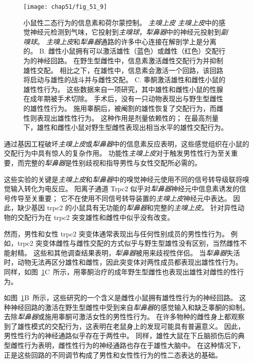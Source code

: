 \begin{figure}[htbp]
	\centering
	\texttt{[image: chap51/fig\_51\_9]}
	\caption{小鼠性二态行为的信息素和荷尔蒙控制。
		\textit{主嗅上皮} \textit{主嗅上皮}中的感觉神经元检测到气味，它投射到\textit{主嗅球}，\textit{犁鼻器}中的神经元投射到\textit{副嗅球}。
		\textit{主嗅上皮}和\textit{犁鼻器}通路的许多中心连接在解剖学上是分离的\cite{dulac2006genetic}。
		B. 雌性小鼠拥有可以激活雄性（蓝色）或雌性（红色）交配行为的神经回路。
		在野生型雌性中，信息素激活雌性交配行为并抑制雄性交配。
		相比之下，在雄性中，信息素会激活一个回路，该回路将启动与雄性的战斗并与雌性交配\cite{kimchi2007functional}。
		C. 睾酮激活雄性和雌性小鼠的雄性性行为。
		这些数据来自一项研究，其中雄性和雌性小鼠的性腺在成年期被手术切除。
		手术后，没有一只动物表现出与野生型雌性的雄性性行为。
		施用睾酮后，被阉割的雄性恢复了交配行为，而雌性则表现出雄性性行为。
		这种作用是剂量依赖性的；
		在最高剂量下，雄性和雌性小鼠对野生型雌性表现出相当水平的雄性交配行为\cite{edwards1971early}。 }
	\label{fig:51_9}
\end{figure}


通过基因工程破坏\textit{主嗅上皮}或\textit{犁鼻器}中的信息素反应表明，这些感觉组织在小鼠的交配行为中具有惊人的复杂作用。
功能性\textit{主嗅上皮}对于触发男性性行为至关重要，而完整的\textit{犁鼻器}是性别歧视和指导男性与女性交配所必需的。


这些实验的关键是\textit{主嗅上皮}和\textit{犁鼻器}中的嗅觉神经元使用不同的信号转导级联将嗅觉输入转化为电反应。
阳离子通道 Trpc2 似乎对\textit{犁鼻器}神经元中信息素诱发的信号传导至关重要；
它不在使用不同信号转导装置的\textit{主嗅上皮}神经元中表达。
因此，缺少基因 trpc2 的小鼠具有无功能的\textit{犁鼻器}和完整的\textit{主嗅上皮}。
针对异性动物的交配行为在 trpc2 突变雄性和雌性中似乎没有改变。


然而，男性和女性 trpc2 突变体通常表现出与任何性别成员的男性性行为。
例如，trpc2 突变体雌性与雌性交配的方式似乎与野生型雄性没有区别，当然雌性不能射精。
这些和其他调查结果表明，\textit{犁鼻器}被用来歧视性伴侣。
当\textit{犁鼻器}失活时，动物无法再区分雄性和雌性，因此突变体对两性成员都表现出雄性性行为。
同样，如图~\ref{fig:51_9}C~所示，用睾酮治疗的成年野生型雌性也表现出雄性对雌性的性行为。


如图~\ref{fig:51_9}B~所示，这些研究的一个含义是雌性小鼠拥有雄性性行为的神经回路。
这种神经回路的激活在野生型雌性中受到来自\textit{犁鼻器}的感觉输入和缺乏睾酮的抑制。
去除\textit{犁鼻器}或施用睾酮可激活女性的男性性行为。
在许多物种的雌性身上都观察到了雄性模式的交配行为，这表明在老鼠身上的发现可能具有普遍意义。
因此，男性性行为的神经通路似乎存在于两性中。
同样，雄性大鼠在下丘脑损伤后的典型雌性行为表明，雌性性行为的神经通路也存在于雄性大脑中。
在这种情况下，正是这些回路的不同调节构成了男性和女性性行为的性二态表达的基础。



